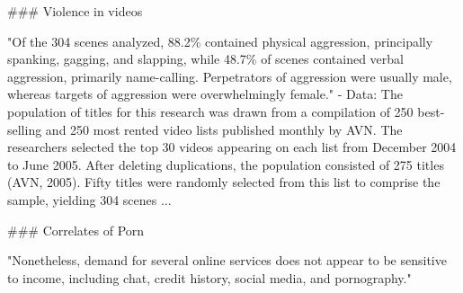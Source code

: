 
### Violence in videos

"Of the 304 scenes analyzed, 88.2\% contained physical aggression, principally spanking, gagging, and slapping, while 48.7\% of scenes contained verbal aggression, primarily name-calling. Perpetrators of aggression were usually male, whereas targets of aggression were overwhelmingly female." \citep{bridges2010aggression}
    - Data:  The population of titles for this research was drawn from a compilation of 250 best-selling and 250 most rented video lists published monthly by AVN. The researchers selected the top 30 videos appearing on each list from December 2004 to June 2005. After deleting duplications, the population consisted of 275 titles (AVN, 2005). Fifty titles were randomly selected from this list to comprise the sample, yielding 304 scenes ...

### Correlates of Porn

"Nonetheless, demand for several online services does not appear to be sensitive to income, including chat, credit history, social media, and pornography." \citep{boik2016empirical}